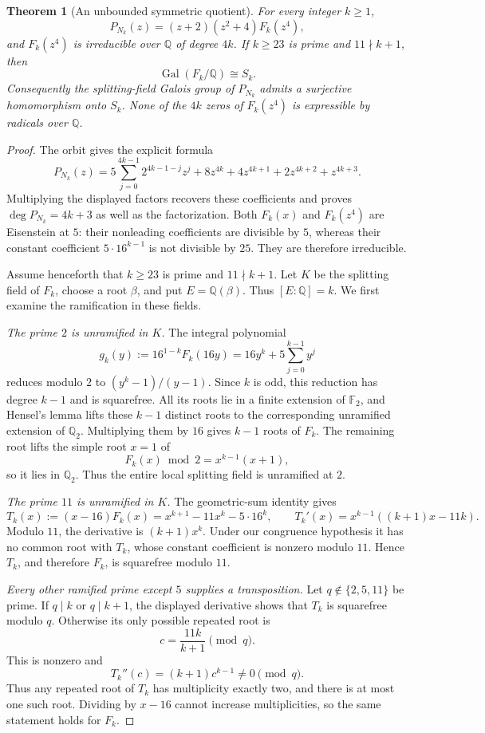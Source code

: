 \documentclass[11pt,a4paper]{article}
\newtheorem{theorem}{Theorem}[section]
\theoremstyle{definition}
\theoremstyle{remark}
\numberwithin{equation}{section}
\begin{document}
\begin{theorem}[An unbounded symmetric quotient]
\label{D:thm:infinite-symmetric-quotient}
For every integer $k\geq1$,
\[
 P_{N_k}(z)=(z+2)(z^2+4)F_k(z^4),
\]
and $F_k(z^4)$ is irreducible over $\mathbb Q$ of degree $4k$.
If $k\geq23$ is prime and $11\nmid k+1$, then
\[
 \operatorname{Gal}(F_k/\mathbb Q)\cong S_k.
\]
Consequently the splitting-field Galois group of $P_{N_k}$ admits a
surjective homomorphism onto $S_k$. None of the $4k$ zeros of
$F_k(z^4)$ is expressible by radicals over $\mathbb Q$.
\end{theorem}

\begin{proof}
The orbit gives the explicit formula
\[
 P_{N_k}(z)=5\sum_{j=0}^{4k-1}2^{4k-1-j}z^j
             +8z^{4k}+4z^{4k+1}+2z^{4k+2}+z^{4k+3}.
\]
Multiplying the displayed factors recovers these coefficients and proves
\(\deg P_{N_k}=4k+3\) as well as the factorization. Both
$F_k(x)$ and $F_k(z^4)$ are Eisenstein at $5$: their nonleading
coefficients are divisible by $5$, whereas their constant coefficient
$5\cdot16^{k-1}$ is not divisible by $25$. They are therefore irreducible.

Assume henceforth that $k\geq23$ is prime and $11\nmid k+1$.
Let $K$ be the splitting field of $F_k$, choose a root $\beta$, and put
$E=\mathbb Q(\beta)$. Thus $[E:\mathbb Q]=k$. We first examine the
ramification in these fields.

\emph{The prime $2$ is unramified in $K$.}
The integral polynomial
\[
 g_k(y):=16^{1-k}F_k(16y)
       =16y^k+5\sum_{j=0}^{k-1}y^j
\]
reduces modulo $2$ to $(y^k-1)/(y-1)$. Since $k$ is odd, this reduction
has degree $k-1$ and is squarefree. All its roots lie in a finite
extension of $\mathbb F_2$, and Hensel's lemma lifts these $k-1$ distinct
roots to the corresponding unramified extension of $\mathbb Q_2$.
Multiplying them by $16$ gives $k-1$ roots of $F_k$. The remaining root
lifts the simple root $x=1$ of
\[
 F_k(x)\bmod2=x^{k-1}(x+1),
\]
so it lies in $\mathbb Q_2$. Thus the entire local splitting field is
unramified at $2$.

\emph{The prime $11$ is unramified in $K$.}
The geometric-sum identity gives
\[
 T_k(x):=(x-16)F_k(x)=x^{k+1}-11x^k-5\cdot16^k,
 \qquad
 T_k'(x)=x^{k-1}((k+1)x-11k).
\]
Modulo $11$, the derivative is $(k+1)x^k$. Under our congruence
hypothesis it has no common root with $T_k$, whose constant coefficient
is nonzero modulo $11$. Hence $T_k$, and therefore $F_k$, is squarefree
modulo $11$.

\emph{Every other ramified prime except $5$ supplies a transposition.}
Let $q\notin\{2,5,11\}$ be prime. If $q\mid k$ or $q\mid k+1$,
the displayed derivative shows that $T_k$ is squarefree modulo $q$.
Otherwise its only possible repeated root is
\[
 c=\frac{11k}{k+1}\pmod q.
\]
This is nonzero and
\[
 T_k''(c)=(k+1)c^{k-1}\ne0\pmod q.
\]
Thus any repeated root of $T_k$ has multiplicity exactly two, and
there is at most one such root. Dividing by $x-16$ cannot increase
multiplicities, so the same statement holds for $F_k$.


\end{proof}
\end{document}
